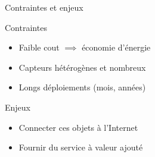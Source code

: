 \begin{frame}{Contraintes et enjeux}
  \begin{block}{Contraintes}
    \begin{itemize}
      \item Faible cout $\implies$ économie d'énergie
      \item Capteurs hétérogènes et nombreux
      \item Longs déploiements (mois, années)
    \end{itemize}
  \end{block}
  \begin{alertblock}{Enjeux}
    \begin{itemize}
      \item Connecter ces objets à l'Internet
      \item Fournir du service à valeur ajouté
    \end{itemize}
  \end{alertblock}
\end{frame}





